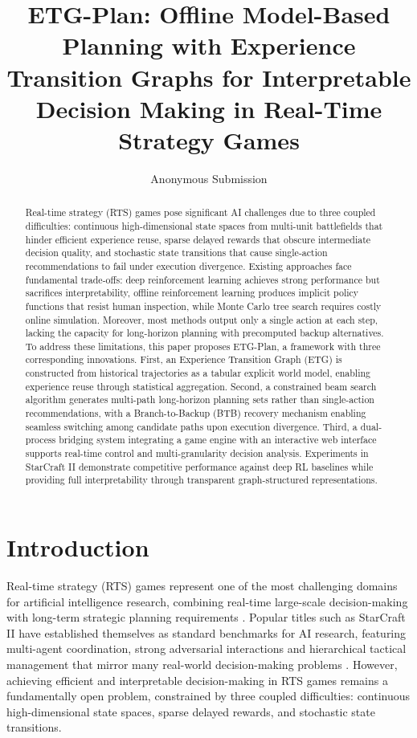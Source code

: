 \documentclass[letterpaper]{article}
\title{ETG-Plan: Offline Model-Based Planning with Experience Transition Graphs for Interpretable Decision Making in Real-Time Strategy Games}
\author{
    Anonymous Submission
}
\begin{document}
\maketitle

\begin{abstract}
	Real-time strategy (RTS) games pose significant AI challenges due to three coupled difficulties: continuous high-dimensional state spaces from multi-unit battlefields that hinder efficient experience reuse, sparse delayed rewards that obscure intermediate decision quality, and stochastic state transitions that cause single-action recommendations to fail under execution divergence. Existing approaches face fundamental trade-offs: deep reinforcement learning achieves strong performance but sacrifices interpretability, offline reinforcement learning produces implicit policy functions that resist human inspection, while Monte Carlo tree search requires costly online simulation. Moreover, most methods output only a single action at each step, lacking the capacity for long-horizon planning with precomputed backup alternatives. To address these limitations, this paper proposes ETG-Plan, a framework with three corresponding innovations. First, an Experience Transition Graph (ETG) is constructed from historical trajectories as a tabular explicit world model, enabling experience reuse through statistical aggregation. Second, a constrained beam search algorithm generates multi-path long-horizon planning sets rather than single-action recommendations, with a Branch-to-Backup (BTB) recovery mechanism enabling seamless switching among candidate paths upon execution divergence. Third, a dual-process bridging system integrating a game engine with an interactive web interface supports real-time control and multi-granularity decision analysis. Experiments in StarCraft II demonstrate competitive performance against deep RL baselines while providing full interpretability through transparent graph-structured representations.
\end{abstract}

\section{Introduction}

Real-time strategy (RTS) games represent one of the most challenging domains for artificial intelligence research, combining real-time large-scale decision-making with long-term strategic planning requirements \citep{ontanon2013survey}. Popular titles such as StarCraft II have established themselves as standard benchmarks for AI research, featuring multi-agent coordination, strong adversarial interactions and hierarchical tactical management that mirror many real-world decision-making problems \citep{vinyals2019alphastar}. However, achieving efficient and interpretable decision-making in RTS games remains a fundamentally open problem, constrained by three coupled difficulties: continuous high-dimensional state spaces, sparse delayed rewards, and stochastic state transitions.
\end{document}
